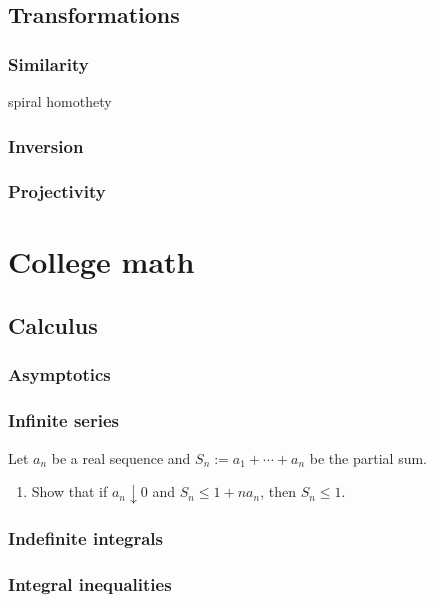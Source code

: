 \documentclass{../../large}
\begin{document}
\chapter{Transformations}
\section{Similarity}
spiral homothety

\section{Inversion}

\section{Projectivity}




\part{College math}
\chapter{Calculus}



\section{Asymptotics}
\section{Infinite series}
Let $a_n$ be a real sequence and $S_n:=a_1+\cdots+a_n$ be the partial sum.
\begin{enumerate}
\item Show that if $a_n\downarrow0$ and $S_n\le1+na_n$, then $S_n\le1$.
\end{enumerate}



\section{Indefinite integrals}
\section{Integral inequalities}
\end{document}

